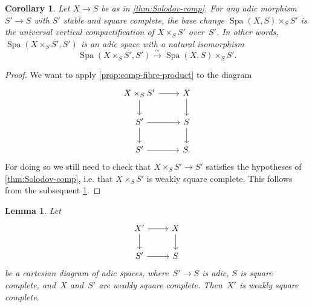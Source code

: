 \documentclass[a4paper,twoside,11pt,reqno]{amsart}
\DeclareMathOperator{\Spa}{Spa}
\newtheorem{lem}[thm]{Lemma}
\newtheorem{cor}[thm]{Corollary}
\theoremstyle{definition}
\numberwithin{equation}{subsection}
\begin{document}
\begin{cor} \label{cor:functoriality-compactification}
    Let $X \to S$ be as in \cref{thm:Solodov-comp}.
    For any adic morphism $S' \to S$ with $S'$ stable and square complete, the base change $\Spa(X,S)\times_S S'$ is the universal vertical compactification of $X \times_S S'$ over~$S'$.
    In other words, $\Spa(X\times_S S',S')$ is an adic space with a natural isomorphism
    \[
     \Spa(X \times_S S',S') \overset{\sim}{\longrightarrow} \Spa(X,S)\times_S S'.
    \]
\end{cor}


\begin{proof}
We want to apply \cref{prop:comp-fibre-product} to the diagram
\[
    \begin{tikzcd}
        X \times_S S'\ar[r] \ar[d] & X\ar[d] \\
        S'\ar[r] \ar[d] & S \ar[d] \\
        S'\ar[r] & S.
    \end{tikzcd}
\]
For doing so we still need to check that $X \times_S S' \to S'$ satisfies the hypotheses of \cref{thm:Solodov-comp}, i.e. that $X \times_S S'$ is weakly square complete.
This follows from the subsequent \cref{lem:square-complete-stable}.
\end{proof}

\begin{lem} \label{lem:square-complete-stable}
    Let
    \[
        \begin{tikzcd}
            X'  \ar[r]  \ar[d]  & X \ar[d]  \\
            S'  \ar[r]          & S
        \end{tikzcd}
    \]
    be a cartesian diagram of adic spaces, where~$S' \to S$ is adic, $S$ is square complete, and~$X$ and~$S'$ are weakly square complete.
    Then~$X'$ is weakly square complete.
\end{lem}
\end{document}
